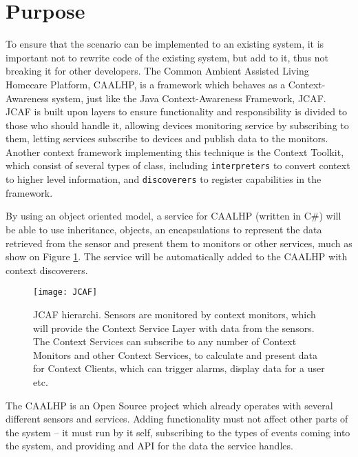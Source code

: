 \section{Purpose}

To ensure that the scenario can be implemented to an existing system, it is important not to rewrite code of the existing system, but add to it, thus not breaking it for other developers.
The Common Ambient Assisted Living Homecare Platform, CAALHP, is a framework which behaves as a Context-Awareness system, just like the Java Context-Awareness Framework\cite{JCAF}, JCAF.
JCAF is built upon layers to ensure functionality and responsibility is divided to those who should handle it, allowing devices monitoring service by subscribing to them, letting services subscribe to devices and publish data to the monitors.
Another context framework implementing this technique is the Context Toolkit\cite{ContextToolkit}, which consist of several types of class, including \texttt{interpreters} to convert context to higher level information, and \texttt{discoverers} to register capabilities in the framework.

By using an object oriented model, a service for CAALHP (written in C\#) will be able to use inheritance, objects, an encapsulations to represent the data retrieved from the sensor and present them to monitors or other services, much as show on Figure \ref{fig:JCAF}.
The service will be automatically added to the CAALHP with context discoverers.

\begin{figure}[hbtp]
	\centering
	\texttt{[image: JCAF]}
	\caption{JCAF hierarchi\cite[5]{JCAF}. 
	Sensors are monitored by context monitors, which will provide the Context Service Layer with data from the sensors.
	The Context Services can subscribe to any number of Context Monitors and other Context Services, to calculate and present data for Context Clients, which can trigger alarms, display data for a user etc.}
	\label{fig:JCAF}
\end{figure}

The CAALHP is an Open Source project\cite{BB-CAALHP} which already operates with several different sensors and services.
Adding functionality must not affect other parts of the system -- it must run by it self, subscribing to the types of events coming into the system, and providing and API for the data the service handles.

